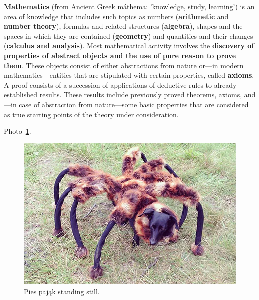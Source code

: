 \def\ind{\quad}
\textbf{Mathematics} (from Ancient Greek máthēma: \underline{'knowledge, study, learning'}) is an area of knowledge 
that includes such topics as numbers (\textbf{arithmetic} and \textbf{number theory}), formulas and related structures (\textbf{algebra}), shapes and the spaces in which they are contained (\textbf{geometry}) and quantities and their changes (\textbf{calculus and analysis}).
\endgraf
\def\ind{\quad}
Most mathematical activity involves the \textbf{discovery of properties of abstract objects and the use of pure reason to prove them}. These objects consist of either abstractions from nature or—in modern mathematics—entities that are stipulated with certain properties, called \textbf{axioms}. A proof consists of a succession of applications of deductive rules to already established results. These results include previously proved theorems, axioms, and—in case of abstraction from nature—some basic properties that are considered as true starting points of the theory under consideration.

Photo~\ref{fig:piespajak}.
\begin{figure}[htbp]
    \centering
    \includegraphics[width=1\textwidth]{Pictures/piespajak.jpg}
    \caption{Pies pająk standing still.}
    \label{fig:piespajak}
\end{figure}